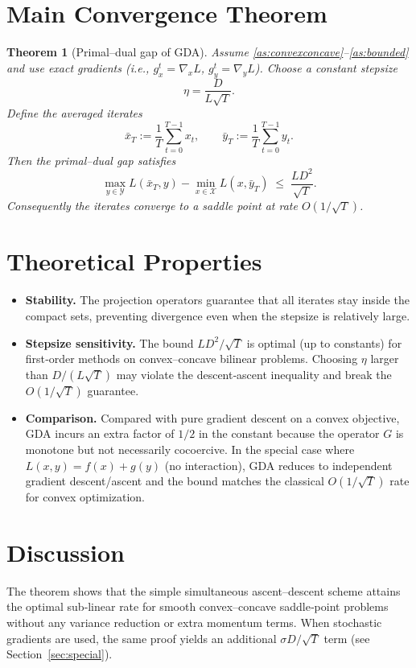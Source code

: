 \documentclass{article}
\newtheorem{theorem}{Theorem}
\begin{document}
\section*{Main Convergence Theorem}
\begin{theorem}[Primal–dual gap of GDA] \label{thm:gap}
Assume \ref{as:convexconcave}–\ref{as:bounded} and use exact gradients (i.e., $g_{x}^{t}=\nabla_{x}L$, $g_{y}^{t}=\nabla_{y}L$).  
Choose a constant stepsize 
\[
\eta = \frac{D}{L\sqrt{T}}.
\]
Define the averaged iterates
\[
\bar{x}_{T} := \frac{1}{T}\sum_{t=0}^{T-1}x_{t},\qquad
\bar{y}_{T} := \frac{1}{T}\sum_{t=0}^{T-1}y_{t}.
\]
Then the \emph{primal–dual gap} satisfies
\[
\max_{y\in\mathcal{Y}}L(\bar{x}_{T},y)-\min_{x\in\mathcal{X}}L(x,\bar{y}_{T})
\;\le\; \frac{LD^{2}}{\sqrt{T}}.
\]
Consequently the iterates converge to a saddle point at rate $O(1/\sqrt{T})$.
\end{theorem}

\section*{Theoretical Properties}
\begin{itemize}[leftmargin=*]
  \item \textbf{Stability.} The projection operators guarantee that all iterates stay inside the compact sets, preventing divergence even when the stepsize is relatively large.
  \item \textbf{Stepsize sensitivity.} The bound $LD^{2}/\sqrt{T}$ is optimal (up to constants) for first‑order methods on convex–concave bilinear problems. Choosing $\eta$ larger than $D/(L\sqrt{T})$ may violate the descent‑ascent inequality and break the $O(1/\sqrt{T})$ guarantee.
  \item \textbf{Comparison.} Compared with pure gradient descent on a convex objective, GDA incurs an extra factor of $1/2$ in the constant because the operator $G$ is monotone but not necessarily cocoercive. In the special case where $L(x,y)=f(x)+g(y)$ (no interaction), GDA reduces to independent gradient descent/ascent and the bound matches the classical $O(1/\sqrt{T})$ rate for convex optimization.
\end{itemize}

\section*{Discussion}
The theorem shows that the simple simultaneous ascent–descent scheme attains the optimal sub‑linear rate for smooth convex–concave saddle‑point problems without any variance reduction or extra momentum terms. When stochastic gradients are used, the same proof yields an additional $\sigma D/\sqrt{T}$ term (see Section~\ref{sec:special}).
\end{document}

